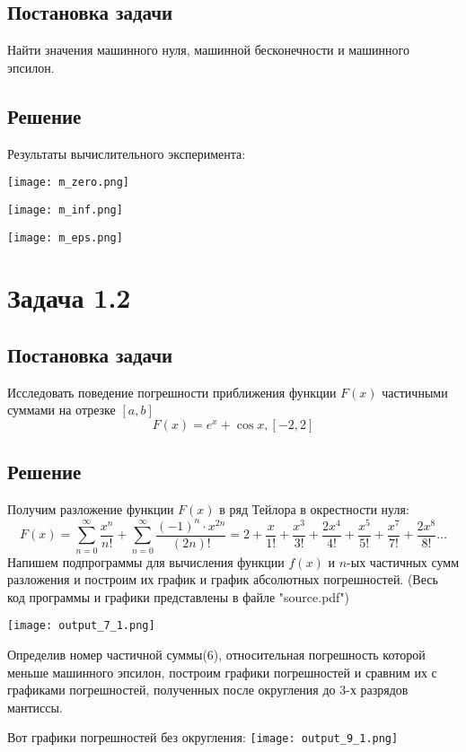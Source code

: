 \documentclass[a4paper,12pt]{report} %
\begin{document}
\subsection*{Постановка задачи}
Найти значения машинного нуля, машинной бесконечности и машинного эпсилон.

\subsection*{Решение}
Результаты вычислительного эксперимента:

\texttt{[image: m\_zero.png]}

\texttt{[image: m\_inf.png]}

\texttt{[image: m\_eps.png]}
\newpage

\section*{Задача 1.2}

\subsection*{Постановка задачи}
Исследовать поведение погрешности приближения функции $F(x)$ частичными суммами на отрезке $[a, b]$
\[
	F(x) = e^x + \cos x, [-2, 2]
\]

\subsection*{Решение}
Получим разложение функции $F(x)$ в ряд Тейлора в окрестности нуля:
\[
	F(x) = \sum\limits_{n=0}^{\infty}\frac{x^n}{n!} + \sum\limits_{n=0}^{\infty}\frac{(-1)^n \cdot x^{2n}}{(2n)!} = 2 + \frac{x}{1!} + \frac{x^3}{3!} + \frac{2x^4}{4!} + \frac{x^5}{5!} + \frac{x^7}{7!} + \frac{2x^8}{8!} \ldots
\]
Напишем подпрограммы для вычисления функции $f(x)$ и $n$-ых частичных сумм разложения и построим их график и график абсолютных погрешностей. (Весь код программы и графики представлены в файле "source.pdf")

\noindent\texttt{[image: output\_7\_1.png]}

Определив номер частичной суммы(6), относительная погрешность которой меньше машинного эпсилон, построим графики погрешностей и сравним их с графиками погрешностей, полученных после округления до 3-х разрядов мантиссы.

Вот графики погрешностей без округления:\newline
\noindent\texttt{[image: output\_9\_1.png]}
\end{document}
